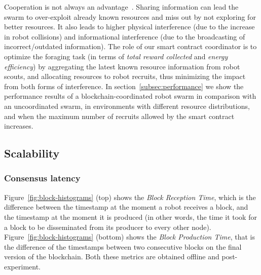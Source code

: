 \documentclass[runningheads]{llncs}
\begin{document}
Cooperation is not always an advantage~\cite{pitonakova_icr_2018}. Sharing information can lead the swarm to over-exploit already known resources and miss out by not exploring for better resources. It also leads to higher physical interference (due to the increase in robot collisions) and informational interference (due to the broadcasting of incorrect/outdated information). The role of our smart contract coordinator is to optimize the foraging task (in terms of \emph{total reward collected} and \emph{energy efficiency}) by aggregating the latest known resource information from robot scouts, and allocating resources to robot recruits, thus minimizing the impact from both forms of interference. In section~\ref{subsec:performance} we show the performance results of a blockchain-coordinated robot swarm in comparison with an uncoordinated swarm, in environments with different resource distributions, and when the maximum number of recruits allowed by the smart contract increases.



\subsection{Scalability}
\label{subsec:scalability}

\subsubsection{Consensus latency}

 Figure~\ref{fig:block-histograms} (top) shows the \emph{Block Reception Time}, which is the difference between the timestamp at the moment a robot receives a block, and the timestamp at the moment it is produced (in other words, the time it took for a block to be disseminated from its producer to every other node). Figure~\ref{fig:block-histograms} (bottom) shows the \emph{Block Production Time}, that is the difference of the timestamps between two consecutive blocks on the final version of the blockchain. Both these metrics are obtained offline and post-experiment.
 
\end{document}
